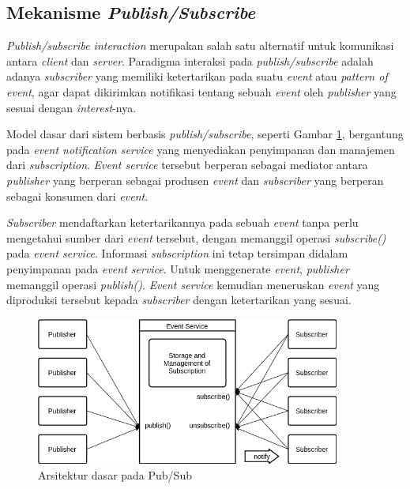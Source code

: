 \subsection{Mekanisme \textit{Publish/Subscribe}}
\label{ssec:pub-sub-mechanism}
\textit{Publish/subscribe interaction} merupakan salah satu alternatif untuk komunikasi antara \textit{client} dan \textit{server}. Paradigma interaksi pada \textit{publish/subscribe} adalah adanya \textit{subscriber} yang memiliki ketertarikan pada suatu \textit{event} atau \textit{pattern of event}, agar dapat dikirimkan notifikasi tentang sebuah \textit{event} oleh \textit{publisher} yang sesuai dengan \textit{interest}-nya.


Model dasar dari sistem berbasis \textit{publish/subscribe}, seperti Gambar \ref{fig:pub-sub-general}, bergantung pada \textit{event notification service} yang menyediakan penyimpanan dan manajemen dari \textit{subscription}. \textit{Event service} tersebut berperan sebagai mediator antara \textit{publisher} yang berperan sebagai produsen \textit{event} dan \textit{subscriber} yang berperan sebagai konsumen dari \textit{event}. 


\textit{Subscriber} mendaftarkan ketertarikannya pada sebuah \textit{event} tanpa perlu mengetahui sumber dari \textit{event} tersebut, dengan memanggil operasi \textit{subscribe()} pada \textit{event service}. Informasi \textit{subscription} ini tetap tersimpan didalam penyimpanan pada \textit{event service}. Untuk menggenerate \textit{event}, \textit{publisher} memanggil operasi \textit{publish()}. \textit{Event service} kemudian meneruskan \textit{event} yang diproduksi tersebut kepada \textit{subscriber} dengan ketertarikan yang sesuai.


\begin{figure}[h]
	\centering
	\includegraphics[width=10cm]{Resources/Images/pub-sub-general}
	\caption{Arsitektur dasar pada Pub/Sub \citep{eugster_many_2003}}
	\label{fig:pub-sub-general}
\end{figure}


